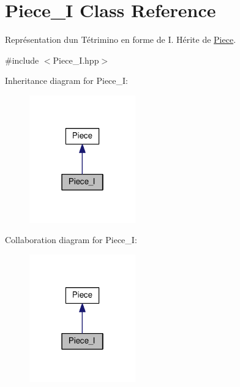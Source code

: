 \hypertarget{classPiece__I}{}\section{Piece\+\_\+I Class Reference}
\label{classPiece__I}


Représentation d\textquotesingle{}un Tétrimino en forme de I. Hérite de \hyperlink{classPiece}{Piece}.  




{\ttfamily \#include $<$Piece\+\_\+\+I.\+hpp$>$}



Inheritance diagram for Piece\+\_\+I\+:
\nopagebreak
\begin{figure}[H]
\begin{center}
\leavevmode
\includegraphics[width=130pt]{classPiece__I__inherit__graph}
\end{center}
\end{figure}


Collaboration diagram for Piece\+\_\+I\+:
\nopagebreak
\begin{figure}[H]
\begin{center}
\leavevmode
\includegraphics[width=130pt]{classPiece__I__coll__graph}
\end{center}
\end{figure}
